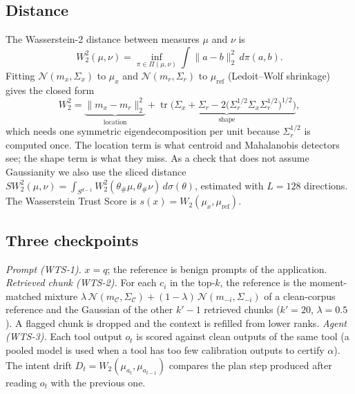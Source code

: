 \documentclass[review,12pt]{elsarticle}
\DeclareMathOperator{\tr}{tr}
\begin{document}
\subsection{Distance}
The Wasserstein-2 distance between measures $\mu$ and $\nu$ is
\begin{equation}
W_2^2(\mu,\nu)=\inf_{\pi\in\Pi(\mu,\nu)}\int\|a-b\|_2^2\,d\pi(a,b).
\end{equation}
Fitting $\mathcal{N}(m_x,\Sigma_x)$ to $\mu_x$ and $\mathcal{N}(m_r,\Sigma_r)$ to $\mu_{\mathrm{ref}}$ (Ledoit--Wolf
shrinkage) gives the closed form
\begin{equation}\label{eq:bw}
W_2^2=\underbrace{\|m_x-m_r\|_2^2}_{\text{location}}
+\underbrace{\tr\!\Big(\Sigma_x+\Sigma_r-2\big(\Sigma_r^{1/2}\Sigma_x\Sigma_r^{1/2}\big)^{1/2}\Big)}_{\text{shape}},
\end{equation}
which needs one symmetric eigendecomposition per unit because $\Sigma_r^{1/2}$ is computed once. The location
term is what centroid and Mahalanobis detectors see; the shape term is what they miss. As a check that
does not assume Gaussianity we also use the sliced distance
$SW_2^2(\mu,\nu)=\int_{S^{d-1}}W_2^2(\theta_\#\mu,\theta_\#\nu)\,d\sigma(\theta)$, estimated with $L=128$
directions. The Wasserstein Trust Score is $s(x)=W_2(\mu_x,\mu_{\mathrm{ref}})$.

\subsection{Three checkpoints}
\emph{Prompt (WTS-1).} $x=q$; the reference is benign prompts of the application.
\emph{Retrieved chunk (WTS-2).} For each $c_i$ in the top-$k$, the reference is the moment-matched mixture
$\lambda\,\mathcal{N}(m_{\mathcal{C}},\Sigma_{\mathcal{C}})+(1-\lambda)\,\mathcal{N}(m_{-i},\Sigma_{-i})$ of a
clean-corpus reference and the Gaussian of the other $k'-1$ retrieved chunks ($k'=20$, $\lambda=0.5$). A
flagged chunk is dropped and the context is refilled from lower ranks.
\emph{Agent (WTS-3).} Each tool output $o_t$ is scored against clean outputs of the same tool (a pooled model
is used when a tool has too few calibration outputs to certify $\alpha$). The intent drift
$D_t=W_2(\mu_{a_t},\mu_{a_{t-1}})$ compares the plan step produced after reading $o_t$ with the previous one.
\end{document}

